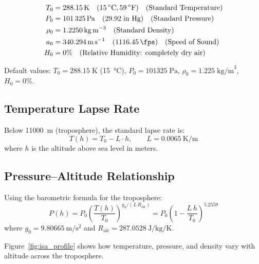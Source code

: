 \documentclass[11pt,twoside,openright]{report}
\newcommand{\degF}{\ensuremath{{}^{\circ}\mathrm{F}}}
\begin{document}
\begin{align}
  T_0 &= \SI{288.15}{\kelvin} \quad (\SI{15}{\celsius}, 59\,\degF) \quad \text{(Standard Temperature)} \\
  P_0 &= \SI{101325}{\pascal} \quad (29.92\;\text{in Hg}) \quad \text{(Standard Pressure)} \\
  \rho_0 &= \SI{1.2250}{\kilogram\per\meter\cubed} \quad \text{(Standard Density)} \\
  a_0 &= \SI{340.294}{\meter\per\second} \quad (\SI{1116.45}{\fps}) \quad \text{(Speed of Sound)} \\
  H_0 &= 0\% \quad \text{(Relative Humidity: completely dry air)}
\end{align}

Default values: $T_0 = 288.15\;\text{K}$ (\SI{15}{\celsius}), $P_0 = 101325\;\text{Pa}$, $\rho_0 = 1.225\;\text{kg/m}^3$, $H_0 = 0\%$.

\subsection{Temperature Lapse Rate}

Below \SI{11000}{\meter} (troposphere), the standard lapse rate is:
\begin{equation}
  T(h) = T_0 - L \cdot h, \qquad L = \SI{0.0065}{\kelvin\per\meter}
  \label{eq:lapse}
\end{equation}
where $h$ is the altitude above sea level in meters.

\subsection{Pressure--Altitude Relationship}

Using the barometric formula for the troposphere:
\begin{equation}
  P(h) = P_0 \left(\frac{T(h)}{T_0}\right)^{g_0/(L\,R_{\mathrm{air}})}
  = P_0 \left(1 - \frac{L\,h}{T_0}\right)^{5.2559}
  \label{eq:pressure_altitude}
\end{equation}
where $g_0 = \SI{9.80665}{\meter\per\second\squared}$ and $R_{\mathrm{air}} = \SI{287.0528}{\joule\per\kilogram\per\kelvin}$.

Figure~\ref{fig:isa_profile} shows how temperature, pressure, and density vary with altitude across the troposphere.
\end{document}
